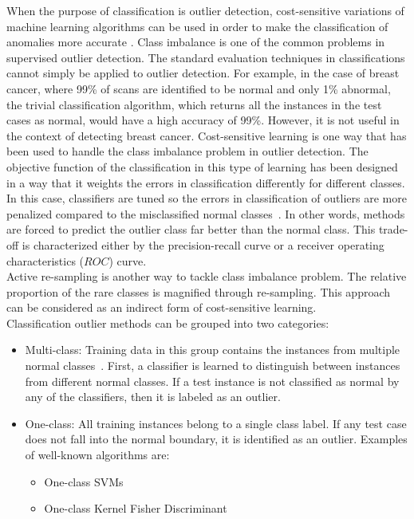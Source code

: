When the purpose of classification is outlier detection, cost-sensitive variations of machine learning algorithms can be used in order to make the classification of anomalies more accurate \cite{aggarwal2013}.
Class imbalance is one of the common problems in supervised outlier detection. The standard evaluation techniques in classifications cannot simply be applied to outlier detection. For example, in the case of breast cancer, where 99\% of scans are identified to be normal and only 1\% abnormal, the trivial classification algorithm, which returns all the instances in the test cases as normal, would have a high accuracy of 99\%. However, it is not useful in the context of detecting breast cancer. Cost-sensitive learning is one way that has been used to handle the class imbalance problem in outlier detection. The objective function of the classification in this type of learning has been designed in a way that it weights the errors in classification differently for different classes.  In this case, classifiers are tuned so the errors in classification of outliers are more penalized compared to the misclassified normal classes~\cite{Elkan2001}. In other words, methods are forced to predict the outlier class far better than the normal class. This trade-off is characterized either by the precision-recall curve or a receiver operating characteristics ($ROC$) curve.\\
Active re-sampling is another way to tackle class imbalance problem. The relative proportion of the rare classes is magnified through re-sampling. This approach can be considered as an indirect form of cost-sensitive learning.\\
Classification outlier methods can be grouped into two categories: 
\begin{itemize}
	\item Multi-class: Training data in this group contains the instances from multiple normal classes~\cite{Claudio2000}. First, a classifier is learned to distinguish between instances from different normal classes. If a test instance is not classified as normal by any of the classifiers, then it is labeled as an outlier.
	\item One-class: All training instances belong to a single class label. If any test case does not fall into the normal boundary, it is identified as an outlier. Examples of well-known algorithms are:
	\begin{itemize}
		\item  One-class SVMs \cite{Scholkopf2001}
		\item  One-class Kernel Fisher Discriminant~\cite{Roth2005}
	\end{itemize}
\end{itemize}


